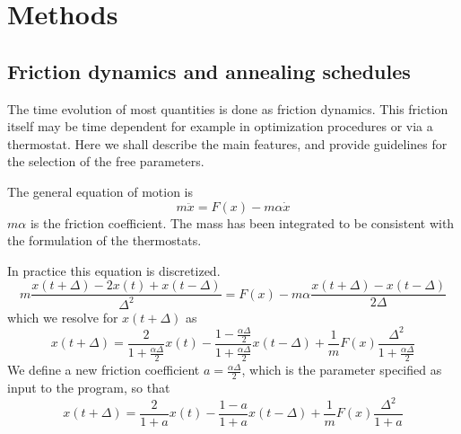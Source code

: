 \documentclass[final,12pt,makeidx,DIV=calc]{article}
\begin{document}
{{{%
\newpage
\section{Methods}
\label{methods}
\subsection{Friction dynamics and annealing schedules}

The time evolution of most quantities is done as friction dynamics.
This friction itself may be time dependent for example in optimization
procedures or via a thermostat. Here we shall describe the main
features, and provide guidelines for the selection of the free
parameters.

The general equation of motion is 
\begin{displaymath}
m\ddot{x}=F(x)-m\alpha\dot{x}
\end{displaymath}
$m\alpha$ is the friction coefficient. The mass has been integrated to
be consistent with the formulation of the thermostats.

In practice this equation is discretized.
\begin{displaymath}
m\frac{x(t+\Delta)-2x(t)+x(t-\Delta)}{\Delta^2}
=F(x)-m\alpha\frac{x(t+\Delta)-x(t-\Delta)}{2\Delta}
\end{displaymath}
which we resolve for $x(t+\Delta)$ as
\begin{displaymath}
x(t+\Delta)=
\frac{2}{1+\frac{\alpha\Delta}{2}}x(t)
-\frac{1-\frac{\alpha\Delta}{2}}{1+\frac{\alpha\Delta}{2}}x(t-\Delta)
+\frac{1}{m}F(x)\frac{\Delta^2}{1+\frac{\alpha\Delta}{2}}
\end{displaymath}
We define a new friction coefficient $a=\frac{\alpha\Delta}{2}$, which is the
parameter specified as input to the program, so that
\begin{displaymath}
x(t+\Delta)=\frac{2}{1+a}x(t)-\frac{1-a}{1+a}x(t-\Delta)
+\frac{1}{m}F(x)\frac{\Delta^2}{1+a}
\end{displaymath}

}}}
\end{document}
